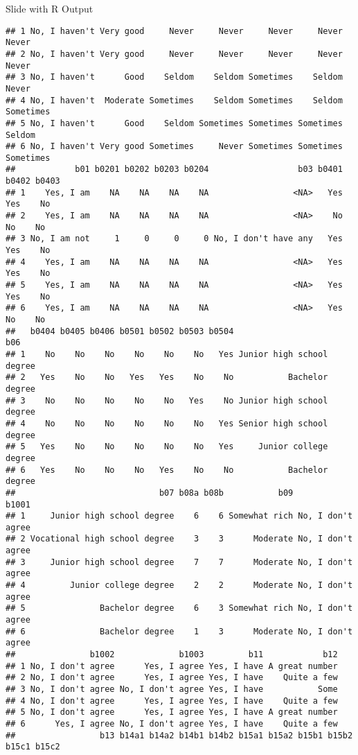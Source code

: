 \documentclass[
  ignorenonframetext,
]{beamer}
\begin{document}
\begin{frame}[fragile]{Slide with R Output}
\begin{verbatim}
## 1 No, I haven't Very good     Never     Never     Never     Never     Never
## 2 No, I haven't Very good     Never     Never     Never     Never     Never
## 3 No, I haven't      Good    Seldom    Seldom Sometimes    Seldom     Never
## 4 No, I haven't  Moderate Sometimes    Seldom Sometimes    Seldom Sometimes
## 5 No, I haven't      Good    Seldom Sometimes Sometimes Sometimes    Seldom
## 6 No, I haven't Very good Sometimes     Never Sometimes Sometimes Sometimes
##            b01 b0201 b0202 b0203 b0204                  b03 b0401 b0402 b0403
## 1    Yes, I am    NA    NA    NA    NA                 <NA>   Yes   Yes    No
## 2    Yes, I am    NA    NA    NA    NA                 <NA>    No    No    No
## 3 No, I am not     1     0     0     0 No, I don't have any   Yes   Yes    No
## 4    Yes, I am    NA    NA    NA    NA                 <NA>   Yes   Yes    No
## 5    Yes, I am    NA    NA    NA    NA                 <NA>   Yes   Yes    No
## 6    Yes, I am    NA    NA    NA    NA                 <NA>   Yes    No    No
##   b0404 b0405 b0406 b0501 b0502 b0503 b0504                       b06
## 1    No    No    No    No    No    No   Yes Junior high school degree
## 2   Yes    No    No   Yes   Yes    No    No           Bachelor degree
## 3    No    No    No    No    No   Yes    No Junior high school degree
## 4    No    No    No    No    No    No   Yes Senior high school degree
## 5   Yes    No    No    No    No    No   Yes     Junior college degree
## 6   Yes    No    No    No   Yes    No    No           Bachelor degree
##                             b07 b08a b08b           b09             b1001
## 1     Junior high school degree    6    6 Somewhat rich No, I don't agree
## 2 Vocational high school degree    3    3      Moderate No, I don't agree
## 3     Junior high school degree    7    7      Moderate No, I don't agree
## 4         Junior college degree    2    2      Moderate No, I don't agree
## 5               Bachelor degree    6    3 Somewhat rich No, I don't agree
## 6               Bachelor degree    1    3      Moderate No, I don't agree
##               b1002             b1003         b11            b12
## 1 No, I don't agree      Yes, I agree Yes, I have A great number
## 2 No, I don't agree      Yes, I agree Yes, I have    Quite a few
## 3 No, I don't agree No, I don't agree Yes, I have           Some
## 4 No, I don't agree      Yes, I agree Yes, I have    Quite a few
## 5 No, I don't agree      Yes, I agree Yes, I have A great number
## 6      Yes, I agree No, I don't agree Yes, I have    Quite a few
##                 b13 b14a1 b14a2 b14b1 b14b2 b15a1 b15a2 b15b1 b15b2 b15c1 b15c2

\end{verbatim}
\end{frame}
\end{document}
